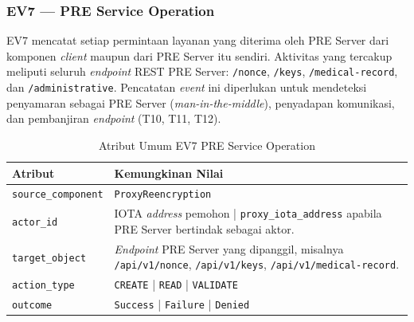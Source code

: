 \subsubsection{EV7 --- PRE Service Operation}
\label{subsec:ev7-pre-service-operation}

EV7 mencatat setiap permintaan layanan yang diterima oleh PRE Server dari
komponen \textit{client} maupun dari PRE Server itu sendiri. Aktivitas yang
tercakup meliputi seluruh \textit{endpoint} REST PRE Server: \texttt{/nonce},
\texttt{/keys}, \texttt{/medical-record}, dan \texttt{/administrative}.
Pencatatan \textit{event} ini diperlukan untuk mendeteksi penyamaran sebagai
PRE Server (\textit{man-in-the-middle}), penyadapan komunikasi, dan pembanjiran
\textit{endpoint} (T10, T11, T12).

\begin{table}[htbp]
\centering
\caption{Atribut Umum EV7 PRE Service Operation}
\label{tab:ev7-umum}
\renewcommand{\arraystretch}{1.3}
\begin{tabular}{|p{3.5cm}|p{8.5cm}|}
\hline
\textbf{Atribut} & \textbf{Kemungkinan Nilai} \\
\hline
\texttt{source\_component} &
\texttt{ProxyReencryption} \\
\hline
\texttt{actor\_id} &
IOTA \textit{address} pemohon | \texttt{proxy\_iota\_address} apabila
PRE Server bertindak sebagai aktor. \\
\hline
\texttt{target\_object} &
\textit{Endpoint} PRE Server yang dipanggil, misalnya
\texttt{/api/v1/nonce}, \texttt{/api/v1/keys},
\texttt{/api/v1/medical-record}. \\
\hline
\texttt{action\_type} &
\texttt{CREATE} | \texttt{READ} | \texttt{VALIDATE} \\
\hline
\texttt{outcome} &
\texttt{Success} | \texttt{Failure} | \texttt{Denied} \\
\hline
\end{tabular}
\end{table}

